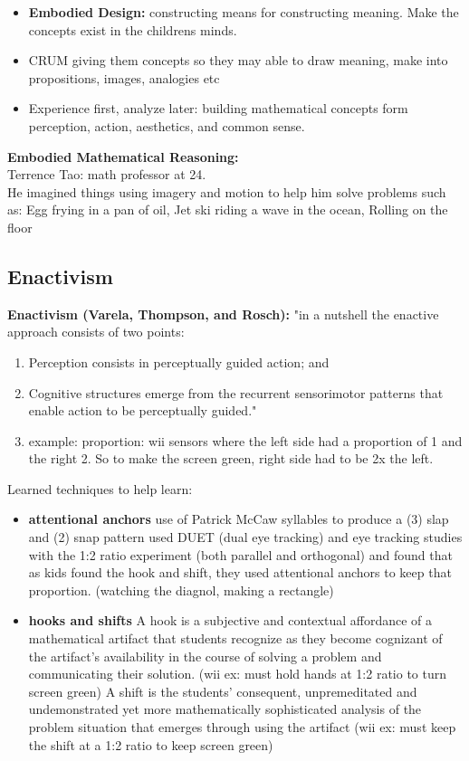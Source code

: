 \documentclass{article}
\begin{document}
\begin{itemize}
    \item \textbf{Embodied Design:} constructing means for constructing meaning. Make the concepts exist in the childrens minds. 
    \item CRUM giving them concepts so they may able to draw meaning, make into propositions, images, analogies etc
    \item Experience first, analyze later: building mathematical concepts form perception, action, aesthetics, and common sense. 
\end{itemize}

\noindent\textbf{Embodied Mathematical Reasoning: } \\
Terrence Tao: math professor at 24. \\
He imagined things using imagery and motion to help him solve problems such as: Egg frying in a pan of oil, Jet ski riding  a wave in the ocean, Rolling on the floor

\subsection{Enactivism}
\textbf{Enactivism (Varela, Thompson, and Rosch):} "in a nutshell the enactive approach consists of two points:
\begin{enumerate}
    \item Perception consists in perceptually guided action; and
    \item Cognitive structures emerge from the recurrent sensorimotor patterns that enable action to be perceptually guided."
    \item example: proportion: wii sensors where the left side had a proportion of 1 and the right 2. So to make the screen green, right side had to be 2x the left. \\
\end{enumerate}

Learned techniques to help learn: 
\begin{itemize}
    \item \textbf{attentional anchors} 
        \subitem use of Patrick McCaw syllables to produce a (3) slap and (2) snap pattern
        \subitem used DUET (dual eye tracking) and eye tracking studies with the 1:2 ratio experiment (both parallel and orthogonal) and found that as kids found the hook and shift, they used attentional anchors to keep that proportion. (watching the diagnol, making a rectangle) 
    \item \textbf{hooks and shifts} 
        \subitem A hook is a subjective and contextual affordance of a mathematical artifact that students recognize as they become cognizant of the artifact’s availability in the course of solving a problem and communicating their solution. (wii ex: must hold hands at 1:2 ratio to turn screen green)
        \subitem A shift is the students’ consequent, unpremeditated and undemonstrated yet more mathematically sophisticated analysis of the problem situation that emerges through using the artifact (wii ex: must keep the shift at a 1:2 ratio to keep screen green) 
\end{itemize}
\end{document}
